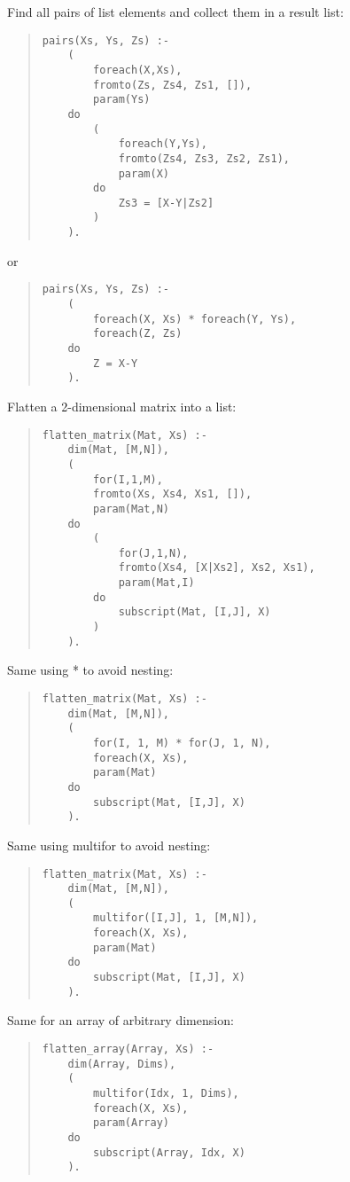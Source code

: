 Find all pairs of list elements and collect them in a result list:
\begin{quote}
\begin{verbatim}
pairs(Xs, Ys, Zs) :-
    (
        foreach(X,Xs),
        fromto(Zs, Zs4, Zs1, []),
        param(Ys)
    do
        (
            foreach(Y,Ys),
            fromto(Zs4, Zs3, Zs2, Zs1),
            param(X)
        do
            Zs3 = [X-Y|Zs2]
        )
    ).
\end{verbatim}
\end{quote}
or
\begin{quote}
\begin{verbatim}
pairs(Xs, Ys, Zs) :-
    (
        foreach(X, Xs) * foreach(Y, Ys),
        foreach(Z, Zs)
    do
        Z = X-Y
    ).
\end{verbatim}
\end{quote}

Flatten a 2-dimensional matrix into a list:
\begin{quote}
\begin{verbatim}
flatten_matrix(Mat, Xs) :-
    dim(Mat, [M,N]),
    (
        for(I,1,M),
        fromto(Xs, Xs4, Xs1, []),
        param(Mat,N)
    do
        (
            for(J,1,N),
            fromto(Xs4, [X|Xs2], Xs2, Xs1),
            param(Mat,I)
        do
            subscript(Mat, [I,J], X)
        )
    ).
\end{verbatim}
\end{quote}

Same using * to avoid nesting:
\begin{quote}
\begin{verbatim}
flatten_matrix(Mat, Xs) :-
    dim(Mat, [M,N]),
    (
        for(I, 1, M) * for(J, 1, N),
        foreach(X, Xs),
        param(Mat)
    do
        subscript(Mat, [I,J], X)
    ).
\end{verbatim}
\end{quote}

Same using multifor to avoid nesting:
\begin{quote}
\begin{verbatim}
flatten_matrix(Mat, Xs) :-
    dim(Mat, [M,N]),
    (
        multifor([I,J], 1, [M,N]),
        foreach(X, Xs),
        param(Mat)
    do
        subscript(Mat, [I,J], X)
    ).
\end{verbatim}
\end{quote}

Same for an array of arbitrary dimension:
\begin{quote}
\begin{verbatim}
flatten_array(Array, Xs) :-
    dim(Array, Dims),
    (
        multifor(Idx, 1, Dims),
        foreach(X, Xs),
        param(Array)
    do
        subscript(Array, Idx, X)
    ).
\end{verbatim}
\end{quote}

